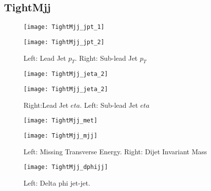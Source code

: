 \documentclass[a4paper,10pt]{article}
\begin{document}
\clearpage
\subsection{TightMjj}

\begin{figure}[!h]
\centering
\begin{minipage}[!h]{0.4\linewidth}
\centering
\texttt{[image: TightMjj\_jpt\_1]}
\end{minipage}%
\begin{minipage}[!h]{0.4\linewidth}
  \texttt{[image: TightMjj\_jpt\_2]}
\end{minipage}
\caption{Left: Lead Jet $p_T$. Right: Sub-lead Jet $p_T$}
\end{figure}

\begin{figure}[!h]
\centering
\begin{minipage}[!h]{0.4\linewidth}
\centering
\texttt{[image: TightMjj\_jeta\_2]}
\end{minipage}%
\begin{minipage}[!h]{0.4\linewidth}
\centering
\texttt{[image: TightMjj\_jeta\_2]}
\end{minipage}
\caption{Right:Lead Jet $eta$. Left: Sub-lead Jet $eta$}
\end{figure}

\begin{figure}[!h]
\centering
\begin{minipage}[!h]{0.4\linewidth}
\centering
\texttt{[image: TightMjj\_met]}
\end{minipage}%
\begin{minipage}[!h]{0.4\linewidth}
\centering
\texttt{[image: TightMjj\_mjj]}
\end{minipage}
\caption{Left: Missing Transverse Energy. Right: Dijet Invariant Mass}
\end{figure}

\begin{figure}[!h]
\centering
\begin{minipage}[!h]{0.4\linewidth}
\centering
\texttt{[image: TightMjj\_dphijj]}
\end{minipage}%
\begin{minipage}[!h]{0.4\linewidth}
\centering
\end{minipage}
\caption{Left: Delta phi jet-jet.}
\end{figure}
\end{document}
